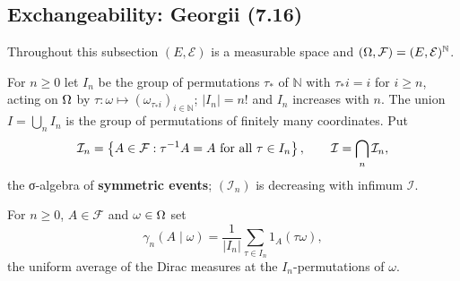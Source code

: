 \subsection*{Exchangeability: Georgii (7.16)}

Throughout this subsection $(E, \mathcal{E})$ is a measurable space and
$(\Omega, \mathcal{F}) = (E, \mathcal{E})^{\mathbb{N}}$.

\begin{definition}
    \label{def:app-symm-sigma}
    \leanok

    For $n \ge 0$ let $I_n$ be the group of permutations $\tau_*$ of $\mathbb{N}$ with
    $\tau_* i = i$ for $i \ge n$, acting on $\Omega$ by
    $\tau : \omega \mapsto (\omega_{\tau_* i})_{i \in \mathbb{N}}$; $|I_n| = n!$ and $I_n$
    increases with $n$.  The union $I = \bigcup_n I_n$ is the group of permutations of finitely
    many coordinates.  Put
    \[\mathcal{I}_n = \left\{ A \in \mathcal{F} : \tau^{-1}A = A \text{ for all } \tau \in I_n \right\},
      \qquad \mathcal{I} = \bigcap_{n} \mathcal{I}_n,\]
    the σ-algebra of \textbf{symmetric events}; $(\mathcal{I}_n)$ is decreasing with infimum
    $\mathcal{I}$.
\end{definition}

\begin{definition}
    \label{def:app-symm-kernel}
    \leanok

    For $n \ge 0$, $A \in \mathcal{F}$ and $\omega \in \Omega$ set
    \[\gamma_n(A \mid \omega) = \frac{1}{|I_n|} \sum_{\tau \in I_n} 1_A(\tau\omega),\]
    the uniform average of the Dirac measures at the $I_n$-permutations of $\omega$.
\end{definition}

